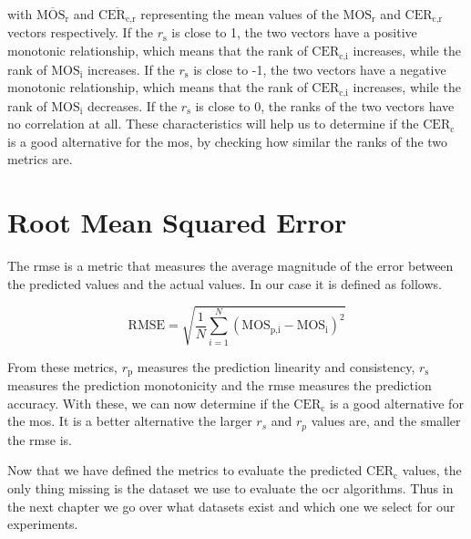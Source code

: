 with $\overline{\text{MOS}_{\text{r}}}$ and $\overline{\text{CER}_{\text{c,r}}}$ representing the mean values of the $\text{MOS}_{\text{r}}$ and $\text{CER}_{\text{c,r}}$ vectors respectively.
If the $r_{\text{s}}$ is close to 1, the two vectors have a positive monotonic relationship, which means that the rank of $\text{CER}_{\text{c,i}}$ increases, while the rank of $\text{MOS}_{\text{i}}$ increases.
If the $r_{\text{s}}$ is close to -1, the two vectors have a negative monotonic relationship, which means that the rank of $\text{CER}_{\text{c,i}}$ increases, while the rank of $\text{MOS}_{\text{i}}$ decreases.
If the $r_{\text{s}}$ is close to 0, the ranks of the two vectors have no correlation at all.
These characteristics will help us to determine if the $\text{CER}_{\text{c}}$ is a good alternative for the \gls{mos}, by checking how similar the ranks of the two metrics are.


\section{Root Mean Squared Error}
\label{sec:rmse}

The \gls{rmse} is a metric that measures the average magnitude of the error between the predicted values and the actual values.
In our case it is defined as follows.

\begin{equation}
    \text{RMSE} = \sqrt{\frac{1}{N}\sum_{i=1}^{N}{(\text{MOS}_{\text{p,i}} - \text{MOS}_{\text{i}})^2}}
    \label{eq:rmse}
\end{equation}

From these metrics, $r_{\text{p}}$ measures the prediction linearity and consistency, $r_{\text{s}}$ measures the prediction monotonicity and the \gls{rmse} measures the prediction accuracy.
With these, we can now determine if the $\text{CER}_{\text{c}}$ is a good alternative for the \gls{mos}.
It is a better alternative the larger $r_s$ and $r_p$ values are, and the smaller the \gls{rmse} is.

Now that we have defined the metrics to evaluate the predicted $\text{CER}_{\text{c}}$ values, the only thing missing is the dataset we use to evaluate the \gls{ocr} algorithms.
Thus in the next chapter we go over what datasets exist and which one we select for our experiments.
